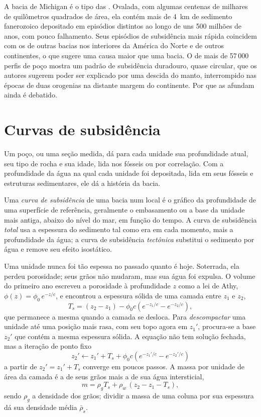 A bacia de Michigan é o tipo das . Ovalada, com algumas centenas de milhares
de quilômetros quadrados de área, ela contém mais de \qty{4}{km} de sedimento fanerozoico depositado
em episódios distintos ao longo de uns 500 milhões de anos, com pouco falhamento. Seus episódios de subsidência
mais rápida coincidem com os de outras bacias nos interiores da América do Norte e de outros
continentes, o que sugere uma causa maior que uma bacia. O  de mais de 57\,000
perfis de poço mostra um padrão de subsidência duradouro, quase circular, que os autores sugerem
poder ser explicado por uma descida do manto, interrompido nas épocas de duas orogenias na distante
margem do continente. Por que as  afundam ainda é debatido.

\section{Curvas de subsidência}\label{sec:b2:basins-compared:curves}

Um poço, ou uma seção medida, dá para cada unidade sua profundidade atual, seu tipo de rocha e sua idade,
lida nos fósseis ou por correlação. Com a profundidade da água na qual cada unidade foi
depositada, lida em seus fósseis e estruturas sedimentares, ele dá a história da bacia.

\begin{definition}\label{def:b2:basins-compared:curve}
Uma \emph{curva de subsidência} de uma bacia num local é o gráfico da profundidade
de uma superfície de referência, geralmente o embasamento ou a base da unidade mais antiga, abaixo do nível do mar,
em função do tempo. A curva de subsidência \emph{total} usa a espessura do sedimento tal como era em cada
momento, mais a profundidade da água; a curva de subsidência \emph{tectônica} substitui o sedimento por água
e remove seu efeito isostático.
\end{definition}

Uma unidade nunca foi tão espessa no passado quanto é hoje. Soterrada, ela perdeu porosidade; seus grãos não
mudaram, mas sua água foi expulsa. O volume do primeiro ano escreveu a porosidade à profundidade
$z$ como a lei de Athy, $\phi(z) = \phi_0\,e^{-z/c}$, e encontrou a espessura sólida de uma camada entre
$z_1$ e $z_2$,
\[
  T_s = (z_2 - z_1) - \phi_0 c\left(e^{-z_1/c} - e^{-z_2/c}\right),
\]
que permanece a mesma quando a camada se desloca. Para \emph{descompactar} uma unidade até uma posição mais rasa,
com seu topo agora em $z_1'$, procura-se a base $z_2'$ que contém a mesma espessura sólida. A
equação não tem solução fechada, mas a iteração de ponto fixo
\[
  z_2' \leftarrow z_1' + T_s + \phi_0 c\left(e^{-z_1'/c} - e^{-z_2'/c}\right)
\]
a partir de $z_2' = z_1' + T_s$ converge em poucos passos. A massa por unidade de área da camada
é a de seus grãos mais a de sua água intersticial,
\[
  m = \rho_g T_s + \rho_w\,(z_2 - z_1 - T_s),
\]
sendo $\rho_g$ a densidade dos grãos; dividir a massa de uma coluna por sua espessura dá
sua densidade média $\bar\rho_s$.

